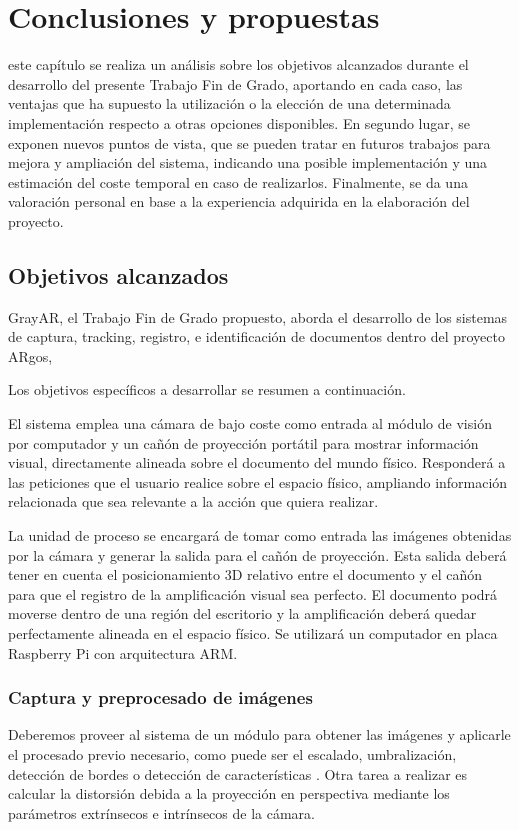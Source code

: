 \chapter{Conclusiones y propuestas}
\label{chap:conclusiones}
 este capítulo se realiza un análisis sobre los objetivos alcanzados durante el desarrollo del presente Trabajo Fin de Grado, aportando en cada caso, las ventajas que ha supuesto la utilización o la elección de una determinada implementación respecto a otras opciones disponibles.  En segundo lugar, se exponen nuevos puntos de vista, que se pueden tratar en futuros trabajos para mejora y ampliación del sistema, indicando una posible implementación y una estimación del coste temporal en caso de realizarlos. Finalmente, se da una valoración personal en base a la experiencia adquirida en la elaboración del proyecto.

\section{Objetivos alcanzados}

GrayAR, el Trabajo Fin de Grado propuesto, aborda el desarrollo de los sistemas de captura, tracking, registro, e identificación de documentos dentro del proyecto ARgos, 


Los objetivos específicos a desarrollar se resumen a continuación.   

El sistema emplea una cámara de bajo coste como entrada al módulo de visión por computador y un cañón de proyección portátil para mostrar información visual, directamente alineada sobre el documento del mundo físico. Responderá a las peticiones que el usuario realice sobre el espacio físico, ampliando información relacionada que sea relevante a la acción que quiera realizar.

La unidad de proceso se encargará de tomar como entrada las imágenes obtenidas por la cámara y generar la salida para el cañón de proyección. Esta salida deberá tener en cuenta el posicionamiento 3D relativo entre el documento y el cañón para que el registro de la amplificación visual sea perfecto. El documento podrá moverse dentro de una región del escritorio y la amplificación deberá quedar perfectamente alineada en el espacio físico. Se utilizará un computador en placa Raspberry Pi con arquitectura ARM.

\subsection{Captura y preprocesado de imágenes}
Deberemos proveer al sistema de un módulo para obtener las imágenes y aplicarle el procesado previo necesario, como puede ser el escalado, umbralización, detección de bordes o detección de características \cite{Ortiz} \cite{Bay}. Otra tarea a realizar es calcular la distorsión debida a la proyección en perspectiva mediante los parámetros extrínsecos e intrínsecos de la cámara.


